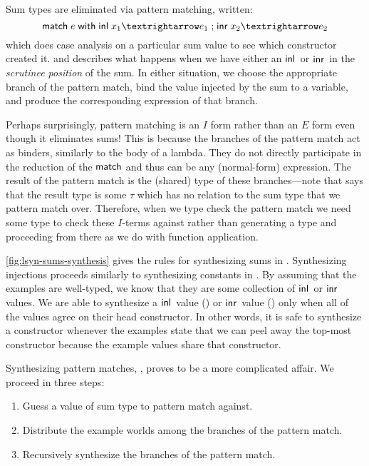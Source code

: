 Sum types are eliminated via pattern matching, written:
\[
  \mmatch\;e\;\mwith\;\minl{x_1} → e_1 \semisep \minr{x_2} → e_2
\]
which does case analysis on a particular sum value to see which constructor created it.
 and  describes what happens when we have either an $\minl{\!}$ or $\minr{\!}$ in the \emph{scrutinee position} of the sum.
In either situation, we choose the appropriate branch of the pattern match, bind the value injected by the sum to a variable, and produce the corresponding expression of that branch.

Perhaps surprisingly, pattern matching is an $I$ form rather than an $E$ form even though it eliminates sums!
This is because the branches of the pattern match act as binders, similarly to the body of a lambda.
They do not directly participate in the reduction of the $\mathsf{match}$ and thus can be any (normal-form) expression.
The result of the pattern match is the (shared) type of these branches---note that  says that the result type is some $τ$ which has no relation to the sum type that we pattern match over.
Therefore, when we type check the pattern match we need some type to check these $I$-terms against rather than generating a type and proceeding from there as we do with function application.



\autoref{fig:lsyn-sums-synthesis} gives the rules for synthesizing sums in \lsyn{}.
Synthesizing injections proceeds similarly to synthesizing constants in \lsyn{}.
By assuming that the examples are well-typed, we know that they are some collection of $\minl{\!}$ or $\minr{\!}$ values.
We are able to synthesize a $\minl{\!}$ value () or $\minr{\!}$ value () only when all of the values agree on their head constructor.
In other words, it is safe to synthesize a constructor whenever the examples state that we can peel away the top-most constructor because the example values share that constructor.

Synthesizing pattern matches, , proves to be a more complicated affair.
We proceed in three steps:
\begin{enumerate}
  \item Guess a value of sum type to pattern match against.
  \item Distribute the example worlds among the branches of the pattern match.
  \item Recursively synthesize the branches of the pattern match.
\end{enumerate}


